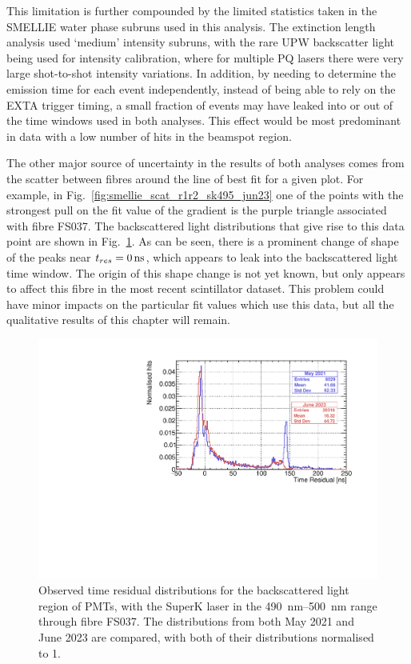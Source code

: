 This limitation is further compounded by the limited statistics taken in the SMELLIE water phase subruns used in this analysis. The extinction length analysis used `medium' intensity subruns, with the rare UPW backscatter light being used for intensity calibration, where for multiple PQ lasers there were very large shot-to-shot intensity variations. In addition, by needing to determine the emission time for each event independently, instead of being able to rely on the EXTA trigger timing, a small fraction of events may have leaked into or out of the time windows used in both analyses. This effect would be most predominant in data with a low number of hits in the beamspot region.

The other major source of uncertainty in the results of both analyses comes from the scatter between fibres around the line of best fit for a given plot. For example, in Fig.~\ref{fig:smellie_scat_r1r2_sk495_jun23} one of the points with the strongest pull on the fit value of the gradient is the purple triangle associated with fibre FS037. The backscattered light distributions that give rise to this data point are shown in Fig.~\ref{fig:smellie_FS037_backscat_tres_comparison}. As can be seen, there is a prominent change of shape of the peaks near $\tres{} = \SI{0}{\ns}$, which appears to leak into the backscattered light time window. The origin of this shape change is not yet known, but only appears to affect this fibre in the most recent scintillator dataset. This problem could have minor impacts on the particular fit values which use this data, but all the qualitative results of this chapter will remain.

\begin{figure}
    \centering
    \includegraphics[width=\textwidth]{5_SMELLIEAnalysis/images/FS037_superK_490_500_May2021_vs_Jun2023_back_tres.pdf}
    \caption[Observed time residual distributions for the backscattered light region for FS037, comparing May 2021 to June 2023 data]
    {Observed time residual distributions for the backscattered light region of PMTs, with the SuperK laser in the \SIrange{490}{500}{\nm} range through fibre FS037. The distributions from both May 2021 and June 2023 are compared, with both of their distributions normalised to 1.}
    \label{fig:smellie_FS037_backscat_tres_comparison}
\end{figure}

